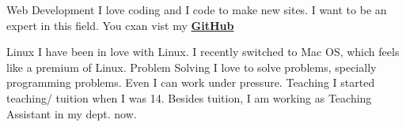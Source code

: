 



\begin{cvskills}
  \cvskill
    {Web Development} %
    {I love coding and I code to make new sites. I want to be an expert in this field. You cxan vist my \href{https://github.com/sorowar-cse}{\textbf{GitHub}}} %

  \cvskill
    {Linux} %
    {I have been in love with Linux. I recently switched to Mac OS, which feels like a premium of Linux.} %
  \cvskill
    {Problem Solving} %
    {I love to solve problems, specially programming problems. Even I can work under pressure.} %
  \cvskill
    {Teaching} %
    {I started teaching/ tuition when I was 14. Besides tuition, I am working as Teaching Assistant in my dept. now.} %

\end{cvskills}